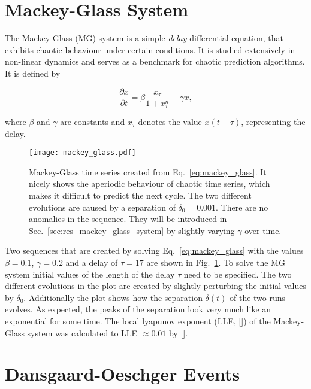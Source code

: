 \newpage
\section{Mackey-Glass System}%
\label{sec:mackey_glass_system}

The Mackey-Glass (MG) system is a simple \emph{delay} differential equation,
that exhibits chaotic behaviour under certain conditions. It is studied
extensively in non-linear dynamics and serves as a benchmark for chaotic
prediction algorithms. It is defined by

\begin{equation}
  \label{eq:mackey_glass}
  \frac{\partial x}{\partial t} = \beta \frac{x_\tau}{1+x_\tau^n} - \gamma x,
\end{equation}

where $\beta$ and $\gamma$ are constants and $x_\tau$ denotes the value
$x(t-\tau)$, representing the delay.
\begin{figure}
  \centering
  \texttt{[image: mackey\_glass.pdf]}
  \caption{Mackey-Glass time series created from Eq.~\ref{eq:mackey_glass}.  It
    nicely shows the aperiodic behaviour of chaotic time series, which makes it
    difficult to predict the next cycle. The two different evolutions are caused by
    a separation of $\delta_0 = 0.001$. There are no anomalies in the
    sequence. They will be introduced in Sec.~\ref{sec:res_mackey_glass_system}
    by slightly varying $\gamma$ over time.}
  \label{fig:mackey_glass}
\end{figure}
Two sequences that are created by solving Eq.~\ref{eq:mackey_glass} with the
values $\beta = 0.1$, $\gamma=0.2$ and a delay of $\tau=17$ are shown in
Fig.~\ref{fig:mackey_glass}. To solve the MG system initial values of the
length of the delay $\tau$ need to be specified. The two different evolutions
in the plot are created by slightly perturbing the initial values by
$\delta_0$. Additionally the plot shows how the separation $\delta(t)$ of the
two runs evolves. As expected, the peaks of the separation look very much like
an exponential for some time.
The local lyapunov exponent (LLE, [\cite{eckhardt1993}]) of the Mackey-Glass
system was calculated to LLE $\approx 0.01$ by [\cite{sprott}].



\newpage
\section{Dansgaard-Oeschger Events}%
\label{sec:dansgaard_oeschger_events}

